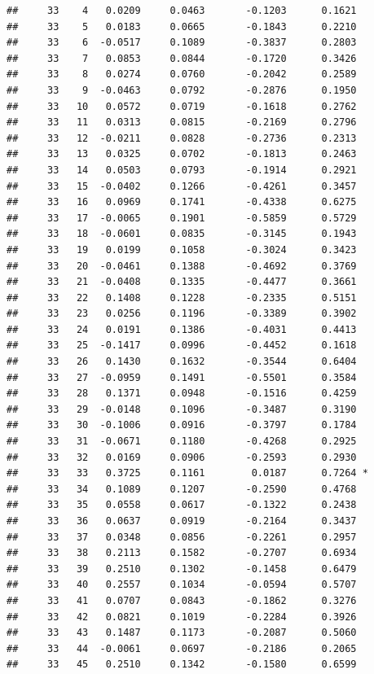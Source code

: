 \documentclass[
]{article}
\begin{document}
\begin{verbatim}
##     33    4   0.0209     0.0463       -0.1203      0.1621  
##     33    5   0.0183     0.0665       -0.1843      0.2210  
##     33    6  -0.0517     0.1089       -0.3837      0.2803  
##     33    7   0.0853     0.0844       -0.1720      0.3426  
##     33    8   0.0274     0.0760       -0.2042      0.2589  
##     33    9  -0.0463     0.0792       -0.2876      0.1950  
##     33   10   0.0572     0.0719       -0.1618      0.2762  
##     33   11   0.0313     0.0815       -0.2169      0.2796  
##     33   12  -0.0211     0.0828       -0.2736      0.2313  
##     33   13   0.0325     0.0702       -0.1813      0.2463  
##     33   14   0.0503     0.0793       -0.1914      0.2921  
##     33   15  -0.0402     0.1266       -0.4261      0.3457  
##     33   16   0.0969     0.1741       -0.4338      0.6275  
##     33   17  -0.0065     0.1901       -0.5859      0.5729  
##     33   18  -0.0601     0.0835       -0.3145      0.1943  
##     33   19   0.0199     0.1058       -0.3024      0.3423  
##     33   20  -0.0461     0.1388       -0.4692      0.3769  
##     33   21  -0.0408     0.1335       -0.4477      0.3661  
##     33   22   0.1408     0.1228       -0.2335      0.5151  
##     33   23   0.0256     0.1196       -0.3389      0.3902  
##     33   24   0.0191     0.1386       -0.4031      0.4413  
##     33   25  -0.1417     0.0996       -0.4452      0.1618  
##     33   26   0.1430     0.1632       -0.3544      0.6404  
##     33   27  -0.0959     0.1491       -0.5501      0.3584  
##     33   28   0.1371     0.0948       -0.1516      0.4259  
##     33   29  -0.0148     0.1096       -0.3487      0.3190  
##     33   30  -0.1006     0.0916       -0.3797      0.1784  
##     33   31  -0.0671     0.1180       -0.4268      0.2925  
##     33   32   0.0169     0.0906       -0.2593      0.2930  
##     33   33   0.3725     0.1161        0.0187      0.7264 *
##     33   34   0.1089     0.1207       -0.2590      0.4768  
##     33   35   0.0558     0.0617       -0.1322      0.2438  
##     33   36   0.0637     0.0919       -0.2164      0.3437  
##     33   37   0.0348     0.0856       -0.2261      0.2957  
##     33   38   0.2113     0.1582       -0.2707      0.6934  
##     33   39   0.2510     0.1302       -0.1458      0.6479  
##     33   40   0.2557     0.1034       -0.0594      0.5707  
##     33   41   0.0707     0.0843       -0.1862      0.3276  
##     33   42   0.0821     0.1019       -0.2284      0.3926  
##     33   43   0.1487     0.1173       -0.2087      0.5060  
##     33   44  -0.0061     0.0697       -0.2186      0.2065  
##     33   45   0.2510     0.1342       -0.1580      0.6599  

\end{verbatim}
\end{document}
